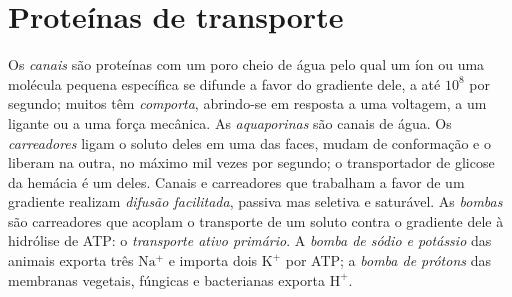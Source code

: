\section{Proteínas de transporte}

\begin{definition}\label{def:b1:membranes-transport:transporters}
Os \emph{canais} são proteínas  com um poro cheio
de água pelo qual um íon ou uma molécula pequena específica se difunde a
favor do gradiente dele, a até $10^8$ por segundo; muitos têm
\emph{comporta}, abrindo-se em resposta a uma voltagem, a um ligante ou
a uma força mecânica. As \emph{aquaporinas} são canais
de água. Os \emph{carreadores} ligam o soluto deles em
uma das faces, mudam de conformação e o liberam na outra, no máximo mil
vezes por segundo; o transportador de glicose da hemácia é um deles.
Canais e carreadores que trabalham a favor de um gradiente realizam
\emph{difusão facilitada}, passiva mas
seletiva e saturável. As \emph{bombas} são carreadores que
acoplam o transporte de um soluto contra o gradiente dele à hidrólise de
ATP: o \emph{transporte ativo primário}. A
\emph{bomba de sódio e potássio} das
 animais exporta três $\mathrm{Na^+}$ e importa dois
$\mathrm{K^+}$ por ATP; a \emph{bomba de prótons} das membranas
vegetais, fúngicas e bacterianas exporta $\mathrm{H^+}$.
\end{definition}

